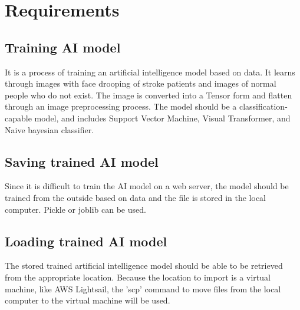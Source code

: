 \section{\textbf{Requirements}}
\subsection{\textbf{Training AI model}}
It is a process of training an artificial intelligence model based on data. It learns through images with face drooping of stroke patients and images of normal people who do not exist. The image is converted into a Tensor form and flatten through an image preprocessing process. The model should be a classification-capable model, and includes Support Vector Machine, Visual Transformer, and Naive bayesian classifier.\\
\subsection{\textbf{Saving trained AI model}}
Since it is difficult to train the AI model on a web server, the model should be trained from the outside based on data and the file is stored in the local computer. Pickle or joblib can be used.\\
\subsection{\textbf{Loading trained AI model}}
The stored trained artificial intelligence model should be able to be retrieved from the appropriate location. Because the location to import is a virtual machine, like AWS Lightsail, the 'scp' command to move files from the local computer to the virtual machine will be used.\\
